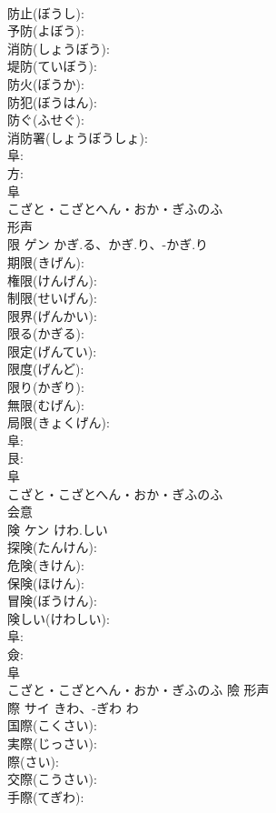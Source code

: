 \documentclass[8pt]{extreport}
\begin{document}
\begin{CJK}{UTF8}{min}
\\	防止(ぼうし): 
\\	予防(よぼう): 
\\	消防(しょうぼう): 
\\	堤防(ていぼう): 
\\	防火(ぼうか): 
\\	防犯(ぼうはん): 
\\	防ぐ(ふせぐ): 
\\	消防署(しょうぼうしょ): 
\\	阜: 
\\	方: 
\\	阜	
\\	こざと・こざとへん・おか・ぎふのふ	
\\	形声 
\\	限	ゲン	かぎ.る、かぎ.り、-かぎ.り		
\\	期限(きげん): 
\\	権限(けんげん): 
\\	制限(せいげん): 
\\	限界(げんかい): 
\\	限る(かぎる): 
\\	限定(げんてい): 
\\	限度(げんど): 
\\	限り(かぎり): 
\\	無限(むげん): 
\\	局限(きょくげん): 
\\	阜: 
\\	艮: 
\\	阜	
\\	こざと・こざとへん・おか・ぎふのふ	
\\	会意 
\\	険	ケン	けわ.しい		
\\	探険(たんけん): 
\\	危険(きけん): 
\\	保険(ほけん): 
\\	冒険(ぼうけん): 
\\	険しい(けわしい): 
\\	阜: 
\\	僉: 
\\	阜	
\\	こざと・こざとへん・おか・ぎふのふ	險	形声 
\\	際	サイ	きわ、-ぎわ	わ	
\\	国際(こくさい): 
\\	実際(じっさい): 
\\	際(さい): 
\\	交際(こうさい): 
\\	手際(てぎわ): 

\end{CJK}
\end{document}
